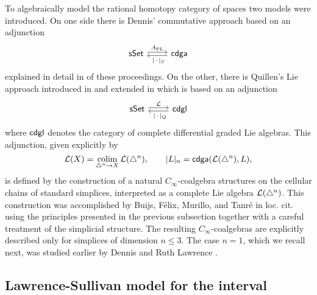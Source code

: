 To algebraically model the rational homotopy category of spaces two models were introduced.
On one side there is Dennis' commutative approach \cite{sullivan1977infinitesimal} based on an adjunction
\[
\begin{tikzcd}
\sSet \arrow[r, shift left=2pt, "A_{\mathrm{PL}}"] &
\cdga \arrow[l, shift left=2pt, "\ \bars{\,\cdot\,}_S"]
\end{tikzcd}
\]
explained in detail in \cite{bibid} of these proceedings.
On the other, there is Quillen's Lie approach introduced in \cite{quillen1969rational} and extended in \cite{buijs2013algebraicmodels, buijs2020liemodels} which is based on an adjunction
\[
\begin{tikzcd}
\sSet \arrow[r, shift left=2pt, "\cL"] &
\cdgl \arrow[l, shift left=2pt, "\ \bars{\,\cdot\,}_Q"]
\end{tikzcd}
\]
where $\mathsf{cdgl}$ denotes the category of complete differential graded Lie algebras.
This adjunction, given explicitly by
\[
\mathcal{L}(X) = \operatorname*{colim}_{\triangle^n \to X} \mathcal{L}(\triangle^n), \qquad
\lvert L\rvert_n = \mathsf{cdga}(\mathcal{L}(\triangle^n), L),
\]
is defined by the construction of a natural $C_\infty$-coalgebra structures on the cellular chains of standard simplices, interpreted as a complete Lie algebra $\mathcal{L}(\triangle^n)$.
This construction was accomplished by Buijs, F{\'e}lix, Murillo, and Tanr{\'e} in loc. cit. using the principles presented in the previous subsection together with a careful treatment of the simplicial structure.
The resulting $C_\infty$-coalgebras are explicitly described only for simplices of dimension $n \leq 3$.
The case $n = 1$, which we recall next, was studied earlier by Dennis and Ruth Lawrence \cite{lawrence2014interval}.

\subsection{Lawrence-Sullivan model for the interval}

